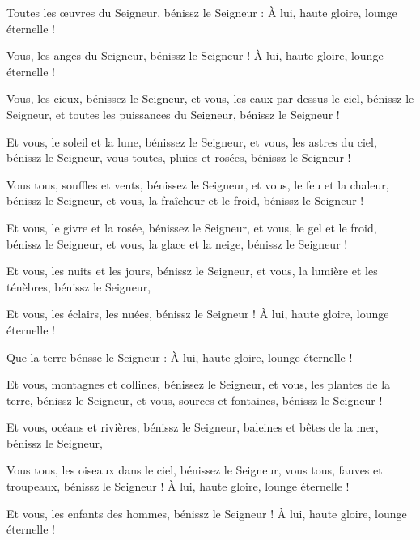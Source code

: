 \item Toutes les œuvres du Seigneur, bénissz le Seigneur :\psstar{} À lui, haute gloire, lounge éternelle !
\item Vous, les anges du Seigneur, bénissz le Seigneur !\psstar{} À lui, haute gloire, lounge éternelle !
\item Vous, les cieux, bénissez le Seigneur,\pscross{} et vous, les eaux par-dessus le ciel, bénissz le Seigneur,\psstar{} et toutes les puissances du Seigneur, bénissz le Seigneur !
\item Et vous, le soleil et la lune, bénissez le Seigneur,\pscross{} et vous, les astres du ciel, bénissz le Seigneur,\psstar{} vous toutes, pluies et rosées, bénissz le Seigneur !
\item Vous tous, souffles et vents, bénissez le Seigneur,\pscross{} et vous, le feu et la chaleur, bénissz le Seigneur,\psstar{} et vous, la fraîcheur et le froid, bénissz le Seigneur !
\item Et vous, le givre et la rosée, bénissez le Seigneur,\pscross{} et vous, le gel et le froid, bénissz le Seigneur,\psstar{} et vous, la glace et la neige, bénissz le Seigneur !
\item Et vous, les nuits et les jours, bénissz le Seigneur,\psstar{} et vous, la lumière et les ténèbres, bénissz le Seigneur,
\item Et vous, les éclairs, les nuées, bénissz le Seigneur !\psstar{} À lui, haute gloire, lounge éternelle !
\item Que la terre bénsse le Seigneur :\psstar{} À lui, haute gloire, lounge éternelle !
\item Et vous, montagnes et collines, bénissez le Seigneur,\pscross{} et vous, les plantes de la terre, bénissz le Seigneur,\psstar{} et vous, sources et fontaines, bénissz le Seigneur !
\item Et vous, océans et rivières, bénissz le Seigneur,\psstar{} baleines et bêtes de la mer, bénissz le Seigneur,
\item Vous tous, les oiseaux dans le ciel, bénissez le Seigneur,\pscross{} vous tous, fauves et troupeaux, bénissz le Seigneur !\psstar{} À lui, haute gloire, lounge éternelle !
\item Et vous, les enfants des hommes, bénissz le Seigneur !\psstar{} À lui, haute gloire, lounge éternelle !

